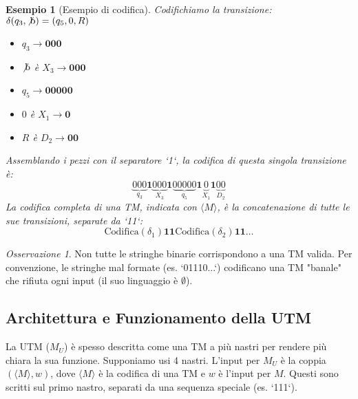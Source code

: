 \documentclass[a4paper]{article}
\newtheorem{example}{Esempio}
\newcommand{\blankS}{\ensuremath{\not\text{b}}} %
\theoremstyle{remark} %
\newtheorem{remark}{Osservazione}
\begin{document}
\begin{example}[Esempio di codifica]
Codifichiamo la transizione: $\delta(q_3, \blankS) = (q_5, 0, R)$
\begin{itemize}
    \item $q_3 \rightarrow \textbf{000}$
    \item $\blankS$ è $X_3 \rightarrow \textbf{000}$
    \item $q_5 \rightarrow \textbf{00000}$
    \item $0$ è $X_1 \rightarrow \textbf{0}$
    \item $R$ è $D_2 \rightarrow \textbf{00}$
\end{itemize}
Assemblando i pezzi con il separatore `1`, la codifica di questa singola transizione è:
\[ \underbrace{000}_{q_3} \mathbf{1} \underbrace{000}_{X_3} \mathbf{1} \underbrace{00000}_{q_5} \mathbf{1} \underbrace{0}_{X_1} \mathbf{1} \underbrace{00}_{D_2} \]
La codifica completa di una TM, indicata con $\langle M \rangle$, è la concatenazione di tutte le sue transizioni, separate da `11`:
\[ \text{Codifica}(\delta_1) \mathbf{11} \text{Codifica}(\delta_2) \mathbf{11} \dots \]
\end{example}

\begin{remark}
Non tutte le stringhe binarie corrispondono a una TM valida. Per convenzione, le stringhe mal formate (es. `01110...`) codificano una TM "banale" che rifiuta ogni input (il suo linguaggio è $\emptyset$).
\end{remark}

\subsection{Architettura e Funzionamento della UTM}

La UTM ($M_U$) è spesso descritta come una TM a più nastri per rendere più chiara la sua funzione. Supponiamo usi 4 nastri. L'input per $M_U$ è la coppia $(\langle M \rangle, w)$, dove $\langle M \rangle$ è la codifica di una TM e $w$ è l'input per $M$. Questi sono scritti sul primo nastro, separati da una sequenza speciale (es. `111`).
\end{document}
